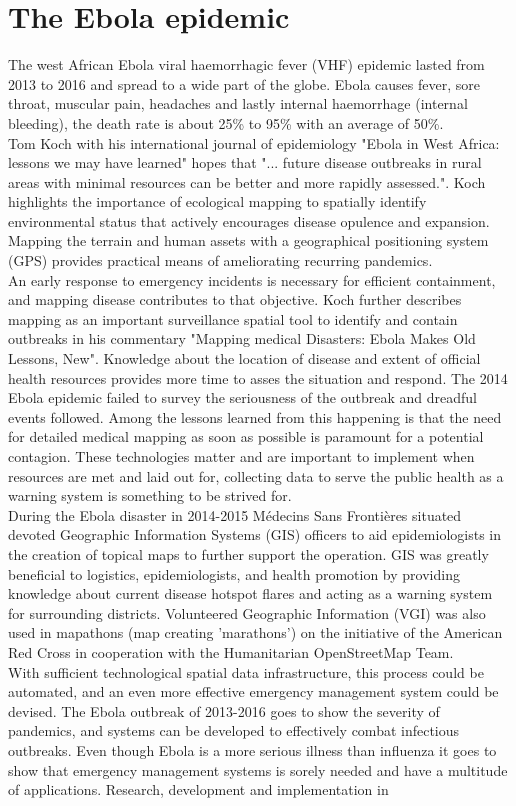 \section{The Ebola epidemic}
The west African Ebola viral haemorrhagic fever (VHF) epidemic lasted from 2013 to 2016 and spread to a wide part of the globe. Ebola causes fever, sore throat, muscular pain, headaches and lastly internal haemorrhage (internal bleeding), the death rate is about 25\% to 95\% with an average of 50\%\cite{who_ebola}. \\Tom Koch\cite{koch2016ebola} with his international journal of epidemiology "Ebola in West Africa: lessons we may have learned" hopes that "... future disease outbreaks in rural areas with minimal resources can be better and more rapidly assessed.". Koch highlights the importance of ecological mapping to spatially identify environmental status that actively encourages disease opulence and expansion. Mapping the terrain and human assets with a geographical positioning system (GPS) provides practical means of ameliorating recurring pandemics. \\An early response to emergency incidents is necessary for efficient containment, and mapping disease contributes to that objective. Koch further describes mapping as an important surveillance spatial tool to identify and contain outbreaks in his commentary "Mapping medical Disasters: Ebola Makes Old Lessons, New"\cite{koch2015mapping}. Knowledge about the location of disease and extent of official health resources provides more time to asses the situation and respond. The 2014 Ebola epidemic failed to survey the seriousness of the outbreak and dreadful events followed. Among the lessons learned from this happening is that the need for detailed medical mapping as soon as possible is paramount for a potential contagion. These technologies matter and are important to implement when resources are met and laid out for, collecting data to serve the public health as a warning system is something to be strived for.\\ During the Ebola disaster in 2014-2015 Médecins Sans Frontières\cite{gis_support} situated devoted Geographic Information Systems (GIS) officers to aid epidemiologists in the creation of topical maps to further support the operation. GIS was greatly beneficial to logistics, epidemiologists, and health promotion by providing knowledge about current disease hotspot flares and acting as a warning system for surrounding districts. Volunteered Geographic Information (VGI) was also used\cite{moeller2015mapping} in mapathons (map creating 'marathons') on the initiative of the American Red Cross in cooperation with the Humanitarian OpenStreetMap Team.\\ With sufficient technological spatial data infrastructure, this process could be automated, and an even more effective emergency management system could be devised. The Ebola outbreak of 2013-2016 goes to show the severity of pandemics, and systems can be developed to effectively combat infectious outbreaks. Even though Ebola is a more serious illness than influenza it goes to show that emergency management systems is sorely needed and have a multitude of applications. Research, development and implementation in 